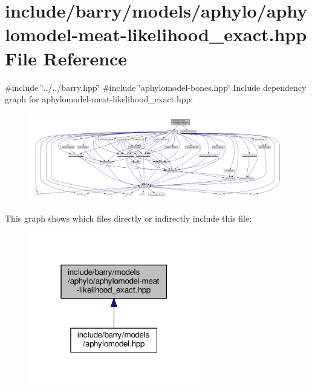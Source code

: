 \hypertarget{aphylomodel-meat-likelihood__exact_8hpp}{}\section{include/barry/models/aphylo/aphylomodel-\/meat-\/likelihood\+\_\+exact.hpp File Reference}
\label{aphylomodel-meat-likelihood__exact_8hpp}
{\ttfamily \#include \char`\"{}../../barry.\+hpp\char`\"{}}\newline
{\ttfamily \#include \char`\"{}aphylomodel-\/bones.\+hpp\char`\"{}}\newline
Include dependency graph for aphylomodel-\/meat-\/likelihood\+\_\+exact.hpp\+:\nopagebreak
\begin{figure}[H]
\begin{center}
\leavevmode
\includegraphics[width=350pt]{aphylomodel-meat-likelihood__exact_8hpp__incl}
\end{center}
\end{figure}
This graph shows which files directly or indirectly include this file\+:\nopagebreak
\begin{figure}[H]
\begin{center}
\leavevmode
\includegraphics[width=211pt]{aphylomodel-meat-likelihood__exact_8hpp__dep__incl}
\end{center}
\end{figure}
